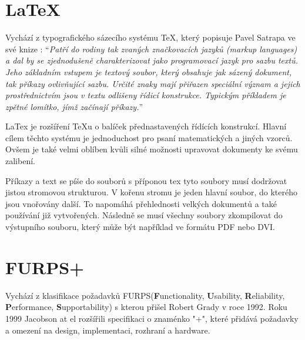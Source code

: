  \section{LaTeX}
	Vychází z typografického sázecího systému TeX, který popisuje Pavel Satrapa ve své knize \cite{latex}: \enquote{\textit{Patří do rodiny tak zvaných značkovacích jazyků (markup languages) a dal by se zjednodušeně charakterizovat jako programovací jazyk pro sazbu textů. Jeho základním vstupem je textový soubor, který obsahuje jak sázený dokument, tak příkazy ovlivňující sazbu. Určité znaky mají přiřazen speciální význam a jejich prostřednictvím jsou v textu odlišeny řídicí konstrukce. Typickým příkladem je zpětné lomítko, jímž začínají příkazy.}}
	
	LaTex je rozšíření TeXu o balíček přednastavených řídících konstrukcí. Hlavní cílem těchto systému je jednoduchost pro psaní matematických a jiných vzorců. Ovšem je také velmi oblíben kvůli silné možnosti upravovat dokumenty ke svému zalibení.
	
	Příkazy a text se píše do souborů s příponou tex tyto soubory musí dodržovat jistou stromovou strukturou. V kořenu stromu je jeden hlavní soubor, do kterého jsou vnořovány další. To napomáhá přehlednosti velkých dokumentů a také používání již vytvořených. Následně se musí všechny soubory zkompilovat do výstupního souboru, který může být například ve formátu PDF nebo DVI. 

\section{FURPS+}
	Vychází z klasifikace požadavků FURPS(\textbf{F}unctionality, \textbf{U}sability, \textbf{R}eliability, \textbf{P}erformance, \textbf{S}upportability) s kterou přišel Robert Grady v roce 1992. Roku 1999 Jacobson at el rozšířili specifikaci o znaménko "+", které přidává požadavky a omezení na design, implementaci, rozhraní a hardware. 
	
